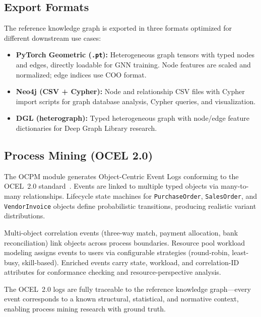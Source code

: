 \subsection{Export Formats}
\label{sec:kg_export}

The reference knowledge graph is exported in three formats optimized for
different downstream use cases:

\begin{itemize}
  \item \textbf{PyTorch Geometric (\texttt{.pt}):} Heterogeneous graph
    tensors with typed nodes and edges, directly loadable for GNN
    training.  Node features are scaled and normalized; edge indices
    use COO format.
  \item \textbf{Neo4j (CSV + Cypher):} Node and relationship CSV files
    with Cypher import scripts for graph database analysis, Cypher
    queries, and visualization.
  \item \textbf{DGL (heterograph):} Typed heterogeneous graph with
    node/edge feature dictionaries for Deep Graph Library research.
\end{itemize}

\subsection{Process Mining (OCEL 2.0)}
\label{sec:kg_ocel}

The OCPM module generates Object-Centric Event Logs conforming to the
OCEL~2.0 standard~\citep{ghahfarokhi2021ocel}.  Events are linked to
multiple typed objects via many-to-many relationships.  Lifecycle state
machines for \texttt{PurchaseOrder}, \texttt{SalesOrder}, and
\texttt{VendorInvoice} objects define probabilistic transitions,
producing realistic variant distributions.

Multi-object correlation events (three-way match, payment allocation,
bank reconciliation) link objects across process boundaries.
Resource pool workload modeling assigns events to users via
configurable strategies (round-robin, least-busy, skill-based).
Enriched events carry state, workload, and correlation-ID
attributes for conformance checking and resource-perspective
analysis.

The OCEL~2.0 logs are fully traceable to the reference knowledge
graph---every event corresponds to a known structural, statistical,
and normative context, enabling process mining research with ground
truth.

